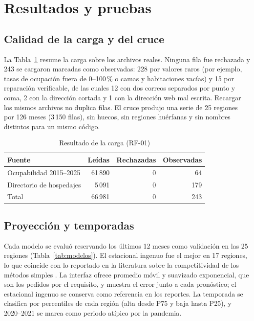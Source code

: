 \documentclass[conference]{IEEEtran}
\begin{document}
\section{Resultados y pruebas}\label{sec:resultados}
\subsection{Calidad de la carga y del cruce}
La Tabla~\ref{tab:carga} resume la carga sobre los archivos reales. Ninguna fila fue rechazada y 243 se cargaron marcadas como observadas: 228 por valores raros (por ejemplo, tasas de ocupación fuera de 0--100\,\% o camas y habitaciones vacías) y 15 por reparación verificable, de las cuales 12 con dos correos separados por punto y coma, 2 con la dirección cortada y 1 con la dirección web mal escrita. Recargar los mismos archivos no duplica filas. El cruce produjo una serie de 25 regiones por 126 meses (3\,150 filas), sin huecos, sin regiones huérfanas y sin nombres distintos para un mismo código.

\begin{table}[t]
\caption{Resultado de la carga (RF-01)}\label{tab:carga}
\centering
\begin{tabular}{@{}lrrr@{}}
\toprule
Fuente & Leídas & Rechazadas & Observadas \\
\midrule
Ocupabilidad 2015--2025 & 61\,890 & 0 & 64 \\
Directorio de hospedajes & 5\,091 & 0 & 179 \\
\midrule
Total & 66\,981 & 0 & 243 \\
\bottomrule
\end{tabular}
\end{table}

\subsection{Proyección y temporadas}
Cada modelo se evaluó reservando los últimos 12 meses como validación en las 25 regiones (Tabla~\ref{tab:modelos}). El estacional ingenuo fue el mejor en 17 regiones, lo que coincide con lo reportado en la literatura sobre la competitividad de los métodos simples \cite{song2008}. La interfaz ofrece promedio móvil y suavizado exponencial, que son los pedidos por el requisito, y muestra el error junto a cada pronóstico; el estacional ingenuo se conserva como referencia en los reportes. La temporada se clasifica por percentiles de cada región (alta desde P75 y baja hasta P25), y 2020--2021 se marca como periodo atípico por la pandemia.
\end{document}
